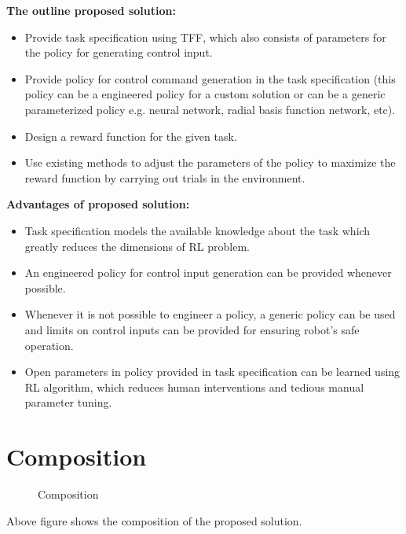 \documentclass[thesis]{mas_proposal}
\begin{document}
\textbf{The outline proposed solution:}
\begin{itemize}
	\item Provide task specification using TFF, which also consists of parameters for the policy for generating control input.
	\item Provide policy for control command generation in the task specification (this policy can be a engineered policy for a custom solution or can be a generic parameterized policy e.g. neural network, radial basis function network, etc).
	\item Design a reward function for the given task.
	\item Use existing methods to adjust the parameters of the policy to maximize the reward function by carrying out trials in the environment.
\end{itemize}

\textbf{Advantages of proposed solution:}
\begin{itemize}
	\item Task specification models the available knowledge about the task which greatly reduces the dimensions of RL problem.
	\item An engineered policy for control input generation can be provided whenever possible. 
	\item Whenever it is not possible to engineer a policy, a generic policy can be used and limits on control inputs can be provided for ensuring robot's safe operation.
	\item Open parameters in policy provided in task specification can be learned using RL algorithm, which reduces human interventions and tedious manual parameter tuning. 

\end{itemize}

\section{Composition}

\begin{figure}[H]
	\caption{\label{fig:composition} Composition}
\end{figure}
Above figure shows the composition of the proposed solution.
\end{document}
